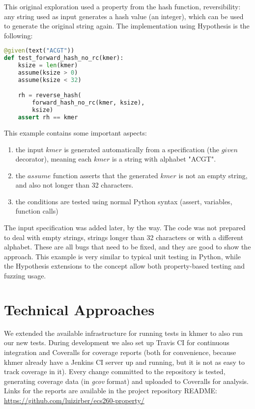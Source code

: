 \documentclass[preprint,nocopyrightspace]{sig-alternate}
\begin{document}
This original exploration used a property from the hash function,
reversibility:
any string used as input generates a hash value (an integer),
which can be used to generate the original string again.
The implementation using Hypothesis is the following:

\begin{lstlisting}[language=Python]
@given(text("ACGT"))
def test_forward_hash_no_rc(kmer):
    ksize = len(kmer)
    assume(ksize > 0)
    assume(ksize < 32)

    rh = reverse_hash(
        forward_hash_no_rc(kmer, ksize),
        ksize)
    assert rh == kmer
\end{lstlisting}

This example contains some important aspects:
\begin{enumerate}
\item the input $kmer$ is generated automatically from a specification (the $given$ decorator),
meaning each $kmer$ is a string with alphabet "ACGT".
\item the $assume$ function asserts that the generated $kmer$ is not an empty string,
and also not longer than 32 characters.
\item the conditions are tested using normal Python syntax (assert, variables, function calls)
\end{enumerate}

The input specification was added later,
by the way.
The code was not prepared to deal with empty strings,
strings longer than 32 characters or with a different alphabet.
These are all bugs that need to be fixed,
and they are good to show the approach.
This example is very similar to typical unit testing in Python,
while the Hypothesis extensions to the concept allow both property-based testing and fuzzing usage.

\section{Technical Approaches}

We extended the available infrastructure for running tests in khmer to also run our new tests.
During development we also set up Travis CI for continuous integration and Coveralls for coverage reports
(both for convenience,
because khmer already have a Jenkins CI server up and running,
but it is not as easy to track coverage in it).
Every change committed to the repository is tested,
generating coverage data (in \emph{gcov} format) and uploaded to Coveralls for analysis.
Links for the reports are available in the project repository README:
\url{https://github.com/luizirber/ecs260-property/}
\end{document}
